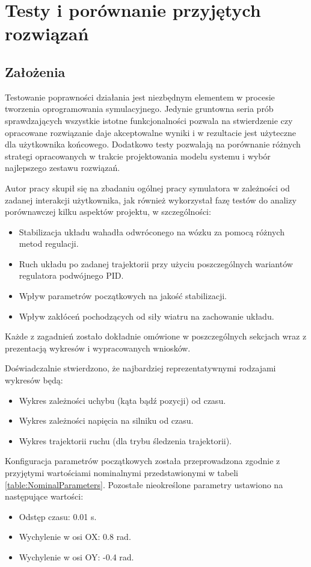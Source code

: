 \documentclass[12pt, oneside]{report}
\theoremstyle{definition}
\begin{document}
\chapter{Testy i porównanie przyjętych rozwiązań}
\section{Założenia}
Testowanie poprawności działania jest niezbędnym elementem w procesie tworzenia oprogramowania symulacyjnego. Jedynie gruntowna seria prób sprawdzających wszystkie istotne funkcjonalności pozwala na stwierdzenie czy opracowane rozwiązanie daje akceptowalne wyniki i w rezultacie jest użyteczne dla użytkownika końcowego. Dodatkowo testy pozwalają na porównanie różnych strategi opracowanych w trakcie projektowania modelu systemu i wybór najlepszego zestawu rozwiązań. 

Autor pracy skupił się na zbadaniu ogólnej pracy symulatora w zależności od zadanej interakcji użytkownika, jak również wykorzystał fazę testów do analizy porównawczej kilku aspektów projektu, w szczególności:
\begin{itemize}
\item Stabilizacja układu wahadła odwróconego na wózku za pomocą różnych metod regulacji.
\item Ruch układu po zadanej trajektorii przy użyciu poszczególnych wariantów regulatora podwójnego PID.
\item Wpływ parametrów początkowych na jakość stabilizacji.
\item Wpływ zakłóceń pochodzących od siły wiatru na zachowanie układu.
\end{itemize}

Każde z zagadnień zostało dokładnie omówione w poszczególnych sekcjach wraz z prezentacją wykresów i wypracowanych wniosków. 

Doświadczalnie stwierdzono, że najbardziej reprezentatywnymi rodzajami wykresów będą:
\begin{itemize}
\item Wykres zależności uchybu (kąta bądź pozycji) od czasu.
\item Wykres zależności napięcia na silniku od czasu.
\item Wykres trajektorii ruchu (dla trybu śledzenia trajektorii).
\end{itemize}

Konfiguracja parametrów początkowych została przeprowadzona zgodnie z przyjętymi wartościami nominalnymi przedstawionymi w tabeli \ref{table:NominalParameters}. Pozostałe nieokreślone parametry ustawiono na następujące wartości:
\begin{itemize}
\item Odstęp czasu: 0.01 s.
\item Wychylenie w osi OX: 0.8 rad.
\item Wychylenie w osi OY: -0.4 rad.
\end{itemize}
\end{document}
